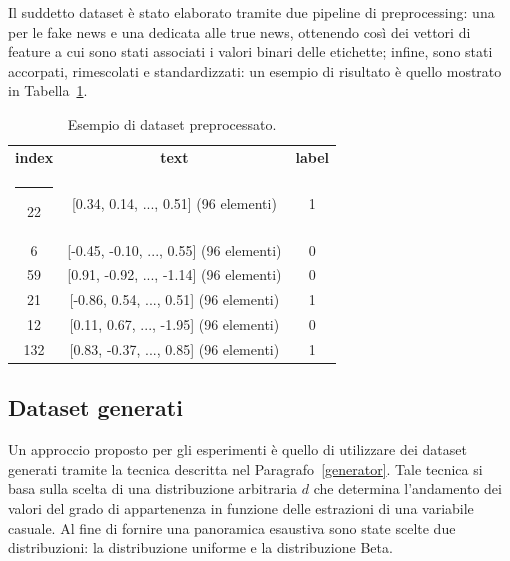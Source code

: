 \documentclass[12pt]{report}
\makeatletter
\theoremstyle{definition}
\newcommand{\thickhline}{%
    \noalign {\ifnum 0=`}\fi \hrule height 1pt
    \futurelet \reserved@a \@xhline
}
\makeatother
\begin{document}
Il suddetto dataset è stato elaborato tramite due pipeline di preprocessing: una per le fake news e una dedicata alle true news, ottenendo così dei vettori di feature a cui sono stati associati i valori binari delle etichette; infine, sono stati accorpati, rimescolati e standardizzati: un esempio di risultato è quello mostrato in Tabella~\ref{preprocesseddata}.
\begin{table}
\centering
 \begin{tabular}{|c|c|c|} 
 \hline 
 \textbf{index} & \textbf{text} & \textbf{label}
\\ [0.5ex] 
 \thickhline
22 & [0.34, 0.14, ..., 0.51] (96 elementi) & 1 \\
6 & [-0.45, -0.10, ..., 0.55] (96 elementi) & 0 \\ 
59 & [0.91, -0.92, ..., -1.14] (96 elementi) & 0\\
21 & [-0.86, 0.54, ..., 0.51] (96 elementi) & 1\\
12 & [0.11, 0.67, ..., -1.95] (96 elementi) & 0\\
132 & [0.83, -0.37, ..., 0.85] (96 elementi) & 1\\
 \hline
\end{tabular}
\caption{Esempio di dataset preprocessato.}
\label{preprocesseddata}
\end{table}

\subsection{Dataset generati}\label{generated_datasets}
Un approccio proposto per gli esperimenti è quello di utilizzare dei dataset generati tramite la tecnica descritta nel Paragrafo~\ref{generator}. Tale tecnica si basa sulla scelta di una distribuzione arbitraria $d$ che determina l'andamento dei valori del grado di appartenenza in funzione delle estrazioni di una variabile casuale. Al fine di fornire una panoramica esaustiva sono state scelte due distribuzioni: la distribuzione uniforme e la distribuzione Beta.
\end{document}
